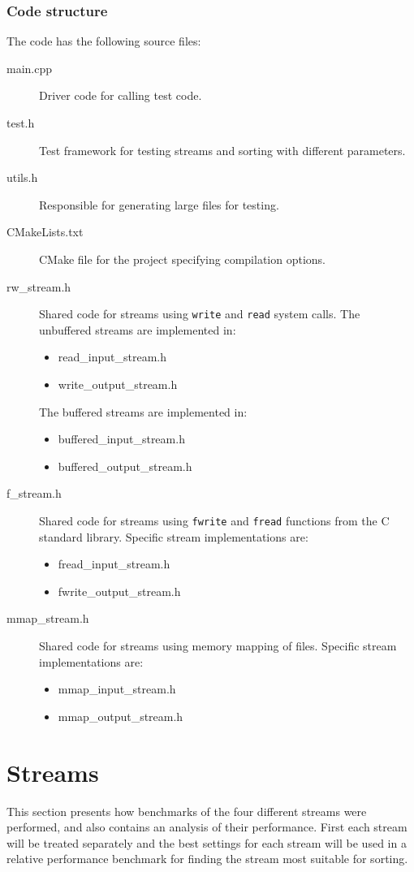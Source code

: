 \documentclass[a4paper,12pt]{article}
\begin{document}
\subsubsection{Code structure}
The code has the following source files:
\begin{description}
\item[main.cpp] Driver code for calling test code.
\item[test.h] Test framework for testing streams and sorting with
  different parameters.
\item[utils.h] Responsible for generating large files for testing.
\item[CMakeLists.txt] CMake file for the project specifying
  compilation options.

\item[rw\_stream.h] Shared code for streams using \texttt{write} and
  \texttt{read} system calls. The unbuffered streams are implemented
  in:
  \begin{itemize}
  \item read\_input\_stream.h
  \item write\_output\_stream.h
  \end{itemize}
  The buffered streams are implemented in:
  \begin{itemize}
  \item buffered\_input\_stream.h
  \item buffered\_output\_stream.h
  \end{itemize}

\item[f\_stream.h] Shared code for streams using \texttt{fwrite} and
  \texttt{fread} functions from the C standard library. Specific
  stream implementations are:
  \begin{itemize}
  \item fread\_input\_stream.h
  \item fwrite\_output\_stream.h
  \end{itemize}

\item[mmap\_stream.h] Shared code for streams using memory mapping of
  files. Specific stream implementations are:
  \begin{itemize}
  \item mmap\_input\_stream.h
  \item mmap\_output\_stream.h
  \end{itemize}
\end{description}

\section{Streams}
This section presents how benchmarks of the four different
streams were performed, and also contains an analysis of their performance. First each stream will
be treated separately and the best settings for each stream will be
used in a relative performance benchmark for finding the stream most
suitable for sorting.
\end{document}
